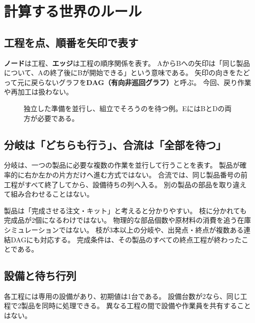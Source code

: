\documentclass[a4paper,11pt]{ltjsarticle}
\newcommand{\term}[1]{\textbf{#1}}
\begin{document}
\section{計算する世界のルール}
\subsection{工程を点、順番を矢印で表す}
\term{ノード}は工程、\term{エッジ}は工程の順序関係を表す。
AからBへの矢印は「同じ製品について、Aの終了後にBが開始できる」という意味である。
矢印の向きをたどって元に戻らないグラフを\term{DAG（有向非巡回グラフ）}と呼ぶ。
今回、戻り作業や再加工は扱わない。

\begin{figure}[htbp]\centering
{}
\caption{独立した準備を並行し、組立でそろうのを待つ例。EにはBとDの両方が必要である。}
\end{figure}

\subsection{分岐は「どちらも行う」、合流は「全部を待つ」}
分岐は、一つの製品に必要な複数の作業を並行して行うことを表す。
製品が確率的に右か左かの片方だけへ進む方式ではない。
合流では、同じ製品番号の前工程がすべて終了してから、設備待ちの列へ入る。
別の製品の部品を取り違えて組み合わせることはない。

製品は「完成させる注文・キット」と考えると分かりやすい。
枝に分かれても完成品が2個になるわけではない。
物理的な部品個数や原材料の消費を追う在庫シミュレーションではない。
枝が3本以上の分岐や、出発点・終点が複数ある連結DAGにも対応する。
完成条件は、その製品のすべての終点工程が終わったことである。

\subsection{設備と待ち行列}
各工程には専用の設備があり、初期値は1台である。
設備台数が2なら、同じ工程で2製品を同時に処理できる。
異なる工程の間で設備や作業員を共有することはない。
\end{document}

